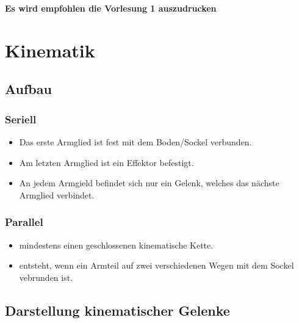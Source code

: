 \begin{minipage}{0.5\linewidth}
\textbf{Es wird empfohlen die Vorlesung 1 auszudrucken}
\end{minipage}

\clearpage
\section{Kinematik}
\subsection{Aufbau}
\begin{minipage}{0.5\linewidth}
\subsubsection{Seriell}
\begin{itemize}
    \item Das erste Armglied ist fest mit dem Boden/Sockel verbunden.
    \item Am letzten Armglied ist ein Effektor befestigt.
    \item An jedem Armgield befindet sich nur ein Gelenk, welches das nächste Armglied verbindet.  
\end{itemize}
\end{minipage}
\begin{minipage}{0.5\linewidth}
\subsubsection{Parallel}
\begin{itemize}
    \item mindestens einen geschlossenen kinematische Kette.
    \item entsteht, wenn ein Armteil auf zwei verschiedenen Wegen mit dem Sockel vebrunden ist.
\end{itemize}
\end{minipage}
	\subsection{Darstellung kinematischer Gelenke}

